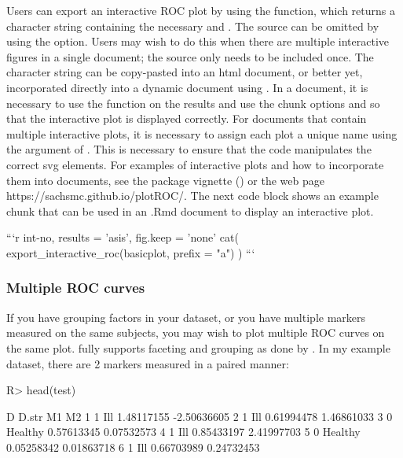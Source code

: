 \documentclass[codesnippet]{jss}
\begin{document}
Users can export an interactive ROC plot by using the
 function, which returns a character string
containing the necessary  and . The
 source can be omitted by using the
 option. Users may wish to do this when there are
multiple interactive figures in a single document; the source only needs
to be included once. The character string can be copy-pasted into an
html document, or better yet, incorporated directly into a dynamic
document using  \citep{knitr}. In a  document, it
is necessary to use the  function on the results and use the
chunk options  and  so
that the interactive plot is displayed correctly. For documents that
contain multiple interactive plots, it is necessary to assign each plot
a unique name using the  argument of
. This is necessary to ensure that the
 code manipulates the correct svg elements. For
examples of interactive plots and how to incorporate them into
 documents, see the package vignette
() or the web page
https://sachsmc.github.io/plotROC/. The next code block shows an example
 chunk that can be used in an .Rmd document to display an
interactive plot.

\begin{Code}
```{r int-no, results = 'asis', fig.keep = 'none'}
cat(
  export_interactive_roc(basicplot, 
                        prefix = "a")
  )
```
\end{Code}

\subsubsection{Multiple ROC curves}\label{multiple-roc-curves}

If you have grouping factors in your dataset, or you have multiple
markers measured on the same subjects, you may wish to plot multiple ROC
curves on the same plot.  fully supports faceting and
grouping as done by . In my example dataset, there are 2
markers measured in a paired manner:

\begin{Schunk}
\begin{Sinput}
R> head(test)
\end{Sinput}
\begin{Soutput}
  D   D.str         M1          M2
1 1     Ill 1.48117155 -2.50636605
2 1     Ill 0.61994478  1.46861033
3 0 Healthy 0.57613345  0.07532573
4 1     Ill 0.85433197  2.41997703
5 0 Healthy 0.05258342  0.01863718
6 1     Ill 0.66703989  0.24732453
\end{Soutput}
\end{Schunk}
\end{document}
